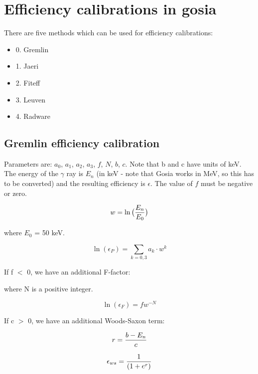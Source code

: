 \chapter{Efficiency calibrations in gosia}
\label{chapt:efficiency}

There are five methods which can be used for efficiency calibrations:\\

\begin{itemize}
\item 0. Gremlin
\item 1. Jaeri
\item 2. Fiteff
\item 3. Leuven
\item 4. Radware
\end{itemize}

\section{Gremlin efficiency calibration}

Parameters are: $a_0$, $a_1$, $a_2$, $a_3$, $f$, $N$, $b$, $c$. Note that b
and c have units of keV. The energy of the $\gamma$ ray is $E_n$ (in keV -
note that Gosia works in MeV, so this has to be converted) and the resulting
efficiency is $\epsilon$. The value of $f$ must be negative or zero.

\begin{equation}
w = \ln\big({E_n \over E_0}\big)
\end{equation}

where $E_0$ = 50 keV.

\begin{equation}
\ln(\epsilon_P) = \sum_{k=0,3} a_k \cdot w^k
\end{equation}

If f $<$ 0, we have an additional F-factor:

where N is a positive integer.

\begin{equation}
\ln(\epsilon_F) = f w^{-N}
\end{equation}

If c $>$ 0, we have an additional Woods-Saxon term:

\begin{equation}
r = {b - E_n \over c}
\end{equation}

\begin{equation}
\epsilon_{ws} = {1 \over (1 + e^r)}
\end{equation}

